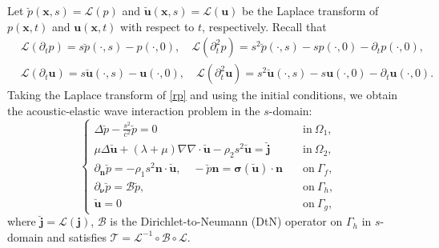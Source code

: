 \documentclass[final,leqno]{siamltex}
\begin{document}
Let $\breve p (\boldsymbol x, s)  = \mathscr L (p)$ and $\breve {\boldsymbol u}
(\boldsymbol x, s)=\mathscr L (\boldsymbol u)$ be the Laplace transform of
$p(\boldsymbol x, t)$ and $\boldsymbol u (\boldsymbol x, t)$ with respect to
$t$, respectively. Recall that
\begin{align*}
 &\mathscr L (\partial_t p) = s \breve p (\cdot, s )- p (\cdot, 0),\quad
 \mathscr  L (\partial_t^2 p)= s^2 \breve {p} (\cdot, s)- s p (\cdot,
0)-\partial_t p (\cdot, 0),\\
& \mathscr L (\partial_t \boldsymbol u)= s \breve {\boldsymbol u} (\cdot, s)-
\boldsymbol u (\cdot, 0),
 \quad \mathscr L (\partial_t^2  \boldsymbol u) = s^2 \breve {\boldsymbol u }
(\cdot, s) - s \boldsymbol u (\cdot, 0)- \partial_t \boldsymbol u (\cdot,0).
\end{align*}
Taking the Laplace transform of \eqref{rp} and using the initial conditions, we
obtain the acoustic-elastic wave interaction problem in the $s$-domain:
\[
 \begin{cases}
  \Delta  \breve {p}  - \frac{s^2}{c^2 } \breve   p =0 \quad  &\text{in}~
\Omega_1,\\
  \mu \Delta \breve { \boldsymbol u } +  (\lambda+\mu) \nabla \nabla \cdot
\breve { \boldsymbol u} -\rho_2 s^2  \breve {\boldsymbol u} = \breve
{\boldsymbol j}\quad  & \text {in}~  \Omega_2,\\
  \partial_{\boldsymbol n}\breve p=-\rho_1 s^2 \boldsymbol n
\cdot \breve {\boldsymbol u}, \quad - \breve {p} \boldsymbol n = \boldsymbol
\sigma ( \breve {\boldsymbol u}) \cdot  \boldsymbol n \quad & \text
{on}~\Gamma_f,\\
  \partial_{\boldsymbol \nu} \breve p= \mathscr{B}  {\breve p}, \quad  &\text
{on}~\Gamma_h, \\
  \breve {\boldsymbol u} =0 \quad & \text {on}~ \Gamma_g,
 \end{cases}
 \]
where $\breve {\boldsymbol  j}= \mathscr L (\boldsymbol j)$, $\mathscr{B}$ is
the Dirichlet-to-Neumann (DtN) operator on $\Gamma_h$ in $s$-domain and
satisfies $\mathscr T= \mathscr L^{-1}\circ\mathscr B  \circ\mathscr L$.
\end{document}
